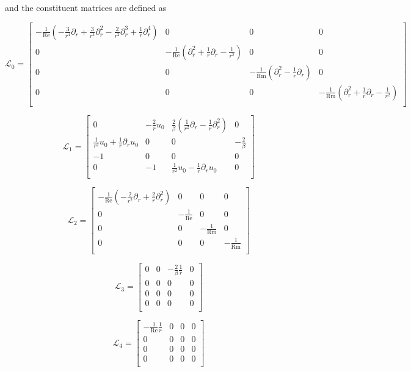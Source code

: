 \documentclass{emulateapj}
\newcommand{\beq}{\begin{equation}}
\newcommand{\eeq}{\end{equation}}
\newcommand\reye{\mathrm{Re}}
\newcommand\reym{\mathrm{Rm}}
\begin{document}
and the constituent matrices are defined as 

\beq
\mathcal{L}_0 = \left[\begin{matrix}
-\frac{1}{\reye} (-\frac{3}{r^4} \partial_r + \frac{3}{r^3}\partial_r^2 - \frac{2}{r^2}\partial_r^3 + \frac{1}{r}\partial_r^4) & 0 & 0 & 0 \\
0 & -\frac{1}{\reye} (\partial_r^2 + \frac{1}{r}\partial_r - \frac{1}{r^2}) & 0 & 0 \\
0 & 0 & -\frac{1}{\reym} (\partial_r^2 - \frac{1}{r} \partial_r) & 0 \\
0 & 0 & 0 & -\frac{1}{\reym} (\partial_r^2 + \frac{1}{r}\partial_r - \frac{1}{r^2}) \\
\end{matrix}\right]
\eeq

\beq
\mathcal{L}_1 = \left[\begin{matrix}
0 & -\frac{2}{r} u_0 & \frac{2}{\beta} (\frac{1}{r^2} \partial_r - \frac{1}{r}\partial_r^2) & 0 \\
\frac{1}{r^2} u_0 + \frac{1}{r}\partial_r u_0 & 0 & 0 & -\frac{2}{\beta} \\
-1 & 0 & 0 & 0 \\
0 & -1 & \frac{1}{r^2} u_0 - \frac{1}{r} \partial_r u_0 & 0 \\
\end{matrix}\right]
\eeq


\beq
\mathcal{L}_2 = \left[\begin{matrix}
-\frac{1}{\reye} (-\frac{2}{r^2}\partial_r + \frac{2}{r}\partial_r^2) & 0 & 0 & 0 \\
0 & -\frac{1}{\reye} & 0 & 0 \\
0 & 0 & -\frac{1}{\reym} & 0 \\
0 & 0 & 0 & -\frac{1}{\reym} \\
\end{matrix}\right]
\eeq

\beq
\mathcal{L}_3 = \left[\begin{matrix}
0 & 0 & -\frac{2}{\beta}\frac{1}{r} & 0 \\
0 & 0 & 0 & 0 \\
0 & 0 & 0 & 0 \\
0 & 0 & 0 & 0 \\
\end{matrix}\right]
\eeq

\beq
\mathcal{L}_4 = \left[\begin{matrix}
-\frac{1}{\reye}\frac{1}{r} & 0 & 0 & 0 \\
0 & 0 & 0 & 0 \\
0 & 0 & 0 & 0 \\
0 & 0 & 0 & 0 \\
\end{matrix}\right]
\eeq
\end{document}
